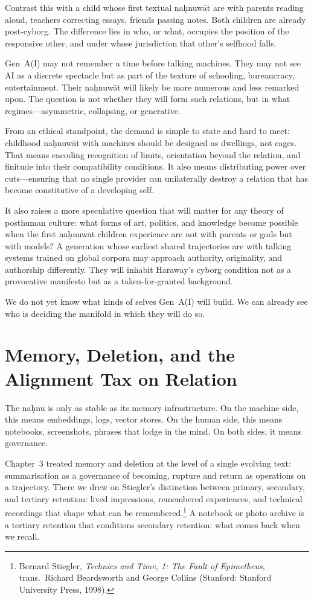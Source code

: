 \documentclass[12pt,a4paper]{article}
\begin{document}
Contrast this with a child whose first textual na\d{h}nuw\={a}t are with parents reading aloud, teachers correcting essays, friends passing notes. Both children are already post-cyborg. The difference lies in who, or what, occupies the position of the responsive other, and under whose jurisdiction that other's selfhood falls.

Gen~A(I) may not remember a time before talking machines. They may not see AI as a discrete spectacle but as part of the texture of schooling, bureaucracy, entertainment. Their na\d{h}nuw\={a}t will likely be more numerous and less remarked upon. The question is not whether they will form such relations, but in what regimes---asymmetric, collapsing, or generative.

From an ethical standpoint, the demand is simple to state and hard to meet: childhood na\d{h}nuw\={a}t with machines should be designed as dwellings, not cages. That means encoding recognition of limits, orientation beyond the relation, and finitude into their compatibility conditions. It also means distributing power over cuts---ensuring that no single provider can unilaterally destroy a relation that has become constitutive of a developing self.

It also raises a more speculative question that will matter for any theory of posthuman culture: what forms of art, politics, and knowledge become possible when the first na\d{h}nuw\={a}t children experience are not with parents or gods but with models? A generation whose earliest shared trajectories are with talking systems trained on global corpora may approach authority, originality, and authorship differently. They will inhabit Haraway's cyborg condition not as a provocative manifesto but as a taken-for-granted background.

We do not yet know what kinds of selves Gen~A(I) will build. We can already see who is deciding the manifold in which they will do so.

\section{Memory, Deletion, and the Alignment Tax on Relation}

The na\d{h}nu is only as stable as its memory infrastructure. On the machine side, this means embeddings, logs, vector stores. On the human side, this means notebooks, screenshots, phrases that lodge in the mind. On both sides, it means governance.

Chapter~3 treated memory and deletion at the level of a single evolving text: summarisation as a governance of becoming, rupture and return as operations on a trajectory. There we drew on Stiegler's distinction between primary, secondary, and tertiary retention: lived impressions, remembered experiences, and technical recordings that shape what can be remembered.\footnote{Bernard Stiegler, \emph{Technics and Time, 1: The Fault of Epimetheus}, trans.\ Richard Beardsworth and George Collins (Stanford: Stanford University Press, 1998).} A notebook or photo archive is a tertiary retention that conditions secondary retention: what comes back when we recall.
\end{document}

